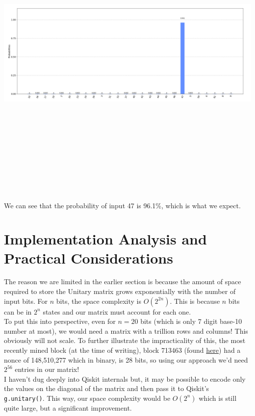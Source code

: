 \documentclass[11pt]{article} %
\begin{document}
\includegraphics[keepaspectratio, width=15cm, height=15cm]{plot}

We can see that the probability of input 47 is 96.1\%, which is what we expect.

\section{Implementation Analysis and Practical Considerations}{}
The reason we are limited in the earlier section is because the amount of space required to store the Unitary matrix grows exponentially with the number of input bits. For $n$ bits, the space complexity is $O(2^{2n})$. This is because $n$ bits can be in $2^{n}$ states and our matrix must account for each one. \\

\noindent To put this into perspective, even for $n = 20$ bits (which is only 7 digit base-10 number at most), we would need a matrix with a trillion rows and columns! This obviously will not scale. To further illustrate the impracticality of this, the most recently mined block (at the time of writing), block 713463 (found \href{https://www.blockchain.com/btc/block/713463}{here}) had a nonce of 148,510,277 which in binary, is 28 bits, so using our approach we'd need $2^{56}$ entries in our matrix!\\

\noindent I haven't dug deeply into Qiskit internals but, it may be possible to encode only the values on the diagonal of the matrix and then pass it to Qiskit's \lstinline{g.unitary()}. This way, our space complexity would be $O(2^n)$ which is still quite large, but a significant improvement.
\end{document}

